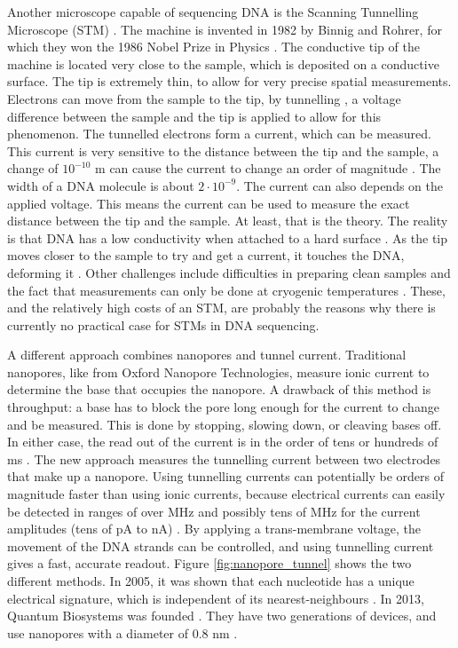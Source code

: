 \documentclass[../main/thesis.tex]{subfiles}
\begin{document}
Another microscope capable of sequencing DNA is the Scanning Tunnelling Microscope (STM) \cite{STM}.
The machine is invented in 1982 by Binnig and Rohrer, for which they won the 1986 Nobel Prize in Physics \cite{STM_nobel}.
The conductive tip of the machine is located very close to the sample, which is deposited on a conductive surface.
The tip is extremely thin, to allow for very precise spatial measurements.
Electrons can move from the sample to the tip, by tunnelling \cite{STM_harvard}, a voltage difference between the sample and the tip is applied to allow for this phenomenon.
The tunnelled electrons form a current, which can be measured.
This current is very sensitive to the distance between the tip and the sample, a change of $10^{-10}$ m can cause the current to change an order of magnitude \cite{STM_DNA}.
The width of a DNA molecule is about $2\cdot10^{-9}$.
The current can also depends on the applied voltage.
This means the current can be used to measure the exact distance between the tip and the sample.
At least, that is the theory.
The reality is that DNA has a low conductivity when attached to a hard surface \cite{STM_DNA2}.
As the tip moves closer to the sample to try and get a current, it touches the DNA, deforming it \cite{STM_DNA}.
Other challenges include difficulties in preparing clean samples and the fact that measurements can only be done at cryogenic temperatures \cite{STM_DNA2}.
These, and the relatively high costs of an STM, are probably the reasons why there is currently no practical case for STMs in DNA sequencing.


A different approach combines nanopores and tunnel current.
Traditional nanopores, like from Oxford Nanopore Technologies, measure ionic current to determine the base that occupies the nanopore.
A drawback of this method is throughput: a base has to block the pore long enough for the current to change and be measured.
This is done by stopping, slowing down, or cleaving bases off.
In either case, the read out of the current is in the order of tens or hundreds of ms \cite{nanopore_tunnel2}.
The new approach measures the tunnelling current between two electrodes that make up a nanopore.
Using tunnelling currents can potentially be orders of magnitude faster than using ionic currents, because electrical currents can easily be detected in ranges of over MHz and possibly tens of MHz for the current amplitudes (tens of pA to nA) \cite{nanopore_tunnel2}.
By applying a trans-membrane voltage, the movement of the DNA strands can be controlled, and using tunnelling current gives a fast, accurate readout.
Figure \ref{fig:nanopore_tunnel} shows the two different methods.
In 2005, it was shown that each nucleotide has a unique electrical signature, which is independent of its nearest-neighbours \cite{nanopore_tunnel}.
In 2013, Quantum Biosystems was founded \cite{quantum_biosystems}.
They have two generations of devices, and use nanopores with a diameter of 0.8 nm \cite{quantum_biosystems2}.
\end{document}

